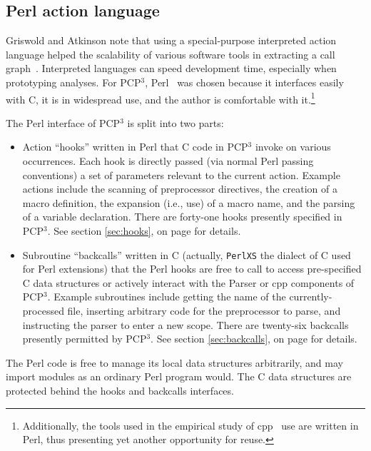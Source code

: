 \documentclass{article}
\newcommand{\pcp}{\mbox{\textsf{PCP}$^3$}}
\newcommand{\Cpp}{\mbox{\textsf{cpp}}}
\newcommand{\Perl}{\mbox{\textsf{Perl}}}
\newcommand{\C}{\mbox{\textsf{C}}}
\newcommand{\sectionref}[1]{section \ref{#1}, on page \pageref{#1}}
\newcommand{\ie}{i.e.,}
\begin{document}
\subsection{Perl action language}

Griswold and Atkinson note that using a special-purpose interpreted
action language helped the scalability of various software tools in
extracting a call graph~\cite{Griswold96}.  Interpreted languages can
speed development time, especially when prototyping analyses.  For
\pcp{}, \Perl{}~\cite{Perl} was chosen because it interfaces
easily with \C{}, it is in widespread use, and the author is comfortable
with it.\footnote{Additionally, the tools used in the empirical study of
  \Cpp{}~\cite{EmpCpp-TR} use are written in \Perl{}, thus
  presenting yet another opportunity for reuse.}

The \Perl{} interface of \pcp{} is split into two parts:

\begin{itemize}
\item Action ``hooks'' written in \Perl{} that \C{} code in \pcp{}
      invoke on various occurrences. Each hook is directly passed (via
      normal \Perl{} passing conventions) a set of parameters relevant
      to the current action.  Example actions include the scanning of
      preprocessor directives, the creation of a macro definition, the
      expansion (\ie{} use) of a macro name, and the parsing of a
      variable declaration.  There are forty-one hooks presently
      specified in \pcp{}. See \sectionref{sec:hooks} for details.
\item Subroutine ``backcalls'' written in \C{} (actually,
      \texttt{PerlXS} the dialect of \C{} used for \Perl{} extensions)
      that the \Perl{} hooks are free to call to access pre-specified
      \C{} data structures or actively interact with the Parser or
      \Cpp{} components of \pcp{}.  Example subroutines include getting
      the name of the currently-processed file, inserting arbitrary code
      for the preprocessor to parse, and instructing the parser to enter
      a new scope.  There are twenty-six backcalls presently permitted
      by \pcp{}.  See \sectionref{sec:backcalls} for details.
\end{itemize}

\noindent The \Perl{} code is free to manage its local data structures
      arbitrarily, and may import modules as an ordinary \Perl{} program
      would.  The \C{} data structures are protected behind the hooks
      and backcalls interfaces.
\end{document}
